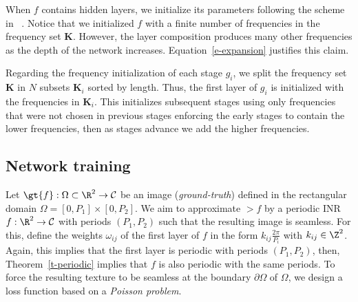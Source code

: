 When $f$ contains hidden layers, we initialize its parameters following the scheme in ~\cite{sitzmann2019siren}. 
Notice that we initialized $f$ with a finite number of frequencies in the frequency set $\textbf{K}$. However, 
the layer composition produces many other frequencies as the depth of the network increases.
Equation~\ref{e-expansion} justifies this claim.


Regarding the frequency initialization of each stage $g_i$, we split the frequency set $\textbf{K}$ in $N$ subsets $\textbf{K}_i$ sorted by length.
Thus, the first layer of $g_i$ is initialized with the frequencies in $\textbf{K}_i$.
This initializes subsequent stages using only frequencies that were not chosen in previous stages enforcing the early stages to contain the lower frequencies, then as stages advance we add the higher frequencies.




\subsection{Network training}
\label{s-training}
Let $\gt{f}:\Omega\subset\R^2\to \mathcal{C}$ be an image (\textit{ground-truth}) defined in the rectangular domain $\Omega=[0,P_1]\times[0,P_2]$. 
We aim to approximate $\gt{f}$ by a periodic INR ${f}:\R^2\to \mathcal{C}$ with periods $(P_1, P_2)$ such that the resulting image is seamless. 
For this, define the weights $\omega_{ij}$ of the first layer of $f$ in the form $k_{ij}\frac{2\pi}{P_i}$ with $k_{ij}\in \Z^2$.
Again, this implies that the first layer is periodic with periods $(P_1,P_2)$, then, Theorem~\ref{t-periodic} implies that $f$ is also periodic with the same periods. 
To force the resulting texture to be seamless at the boundary $\partial \Omega$ of $\Omega$, we design a loss function based on a \textit{Poisson problem}.


